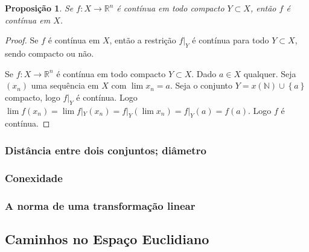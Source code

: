\documentclass{article}
\newtheorem{prop}{Proposição}[section]
\theoremstyle{theorem}
\theoremstyle{lemma}
\theoremstyle{definition}
\theoremstyle{remark}
\begin{document}
\begin{prop}
	Se \(f: X \to \mathbb{R}^n \) é contínua em todo compacto \( Y \subset X\), então \(f\) é contínua em \(X\). 
\end{prop}
\begin{proof}
	Se \(f\) é contínua em \(X\), então a restrição \( f|_{Y}\) é contínua para todo \( Y \subset X\), sendo compacto ou não.

	Se \(f: X \to \mathbb{R}^n \) é contínua em todo compacto \( Y \subset X\). Dado \(a\in X\) qualquer. Seja \( (x_n) \) uma sequência em \( X\) com \( \lim x_n = a\). Seja o conjunto \( Y = x\left( \mathbb{N} \right) \cup \left\{a\right\} \)  compacto, logo \(f|_{Y}\) é contínua. Logo \(\lim  f( x_n) = \lim f|_Y(x_n) = f|_Y(\lim x_n) = f|_Y(a) = f(a)  \). Logo \(f\) é contínua.
\end{proof}
   \subsubsection{ Distância entre dois conjuntos; diâmetro}
   \subsubsection{ Conexidade}
   \subsubsection{ A norma de uma transformação linear}
\subsection{ Caminhos no Espaço Euclidiano}
\end{document}

